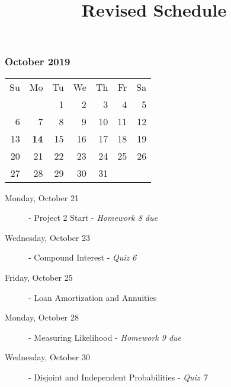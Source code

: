 \documentclass[11pt]{article}
\title{Revised Schedule}
\begin{document}
\maketitle

\subsubsection*{October 2019}
\begin{tabular}{rrrrrrr}
Su & Mo & Tu & We & Th & Fr & Sa\\
   &    &  1 &  2 &  3 &  4 &  5\\
 6 &  7 &  8 &  9 & 10 & 11 & 12\\
13 & {\bf 14} & 15 & 16 & 17 & 18 & 19\\ 
20 & 21 & 22 & 23 & 24 & 25 & 26\\ 
27 & 28 & 29 & 30 & 31 &    &   \\
\end{tabular}
\begin{description}

\item[Monday, October 21]
  - Project 2 Start - {\em Homework 8 due}
\item[Wednesday, October 23]
  - Compound Interest - {\em Quiz 6}
\item[Friday, October 25]
  - Loan Amortization and Annuities

\item[Monday, October 28]
  - Measuring Likelihood - {\em Homework 9 due}
\item[Wednesday, October 30]
  - Disjoint and Independent Probabilities - {\em Quiz 7}
\end{description}

\hrulefill
\end{document}
